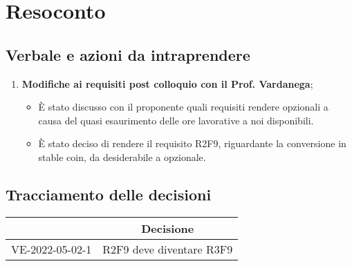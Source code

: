 \section{Resoconto}
\subsection{Verbale e azioni da intraprendere}

\begin{enumerate}
	\item \textbf{Modifiche ai requisiti post colloquio con il Prof. Vardanega};
	\begin{itemize}
		\item È stato discusso con il proponente quali requisiti rendere opzionali a causa del quasi esaurimento delle ore lavorative a noi disponibili.
		\item È stato deciso di rendere il requisito R2F9, riguardante la conversione in stable coin, da desiderabile a opzionale.
	\end{itemize}
\end{enumerate}

\pagebreak

\subsection{Tracciamento delle decisioni}

\begin{table}[H]
	\centering
	\renewcommand{\arraystretch}{1.8}
	\begin{tabular}{c | p{10cm}}
		\rowcolor[HTML]{125E28}
		\multicolumn{1}{c}{\color[HTML]{FFFFFF} \textbf{ID}} &
		\multicolumn{1}{c}{\color[HTML]{FFFFFF} \textbf{Decisione}} \\
		\hline
		VE-2022-05-02-1 & R2F9 deve diventare R3F9 \\ \hline
	\end{tabular}
\end{table}